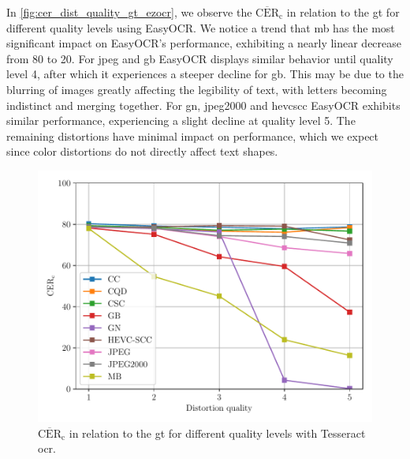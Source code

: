 In \autoref{fig:cer_dist_quality_gt_ezocr}, we observe the $\overline{\text{CER}}_{\text{c}}$ in relation to the \gls{gt} for different quality levels using EasyOCR.
We notice a trend that \gls{mb} has the most significant impact on EasyOCR's performance, exhibiting a nearly linear decrease from 80 to 20.
For \gls{jpeg} and \gls{gb} EasyOCR displays similar behavior until quality level 4, after which it experiences a steeper decline for \gls{gb}.
This may be due to the blurring of images greatly affecting the legibility of text, with letters becoming indistinct and merging together.
For \gls{gn}, \gls{jpeg2000} and \gls{hevcscc} EasyOCR exhibits similar performance, experiencing a slight decline at quality level 5.
The remaining distortions have minimal impact on performance, which we expect since color distortions do not directly affect text shapes.

\begin{figure}[h!]
\centering
    \includegraphics[width=\textwidth]{../../images/analyze/cer_dist_quality_gt_tess.pdf}
    \caption{$\overline{\text{CER}}_{\text{c}}$ in relation to the \gls{gt} for different quality levels with Tesseract \gls{ocr}.}
\label{fig:cer_dist_quality_gt_tesseract}
\end{figure}

